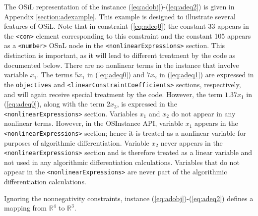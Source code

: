 \documentclass[11pt]{article}
\renewcommand{\_}{{\char"5F}}
\renewcommand{\{}{{\char"7B}}
\renewcommand{\}}{{\char"7D}}
\renewcommand{\^}{{\char"0D}}
\renewcommand{\'}{{\char"0D}}
\begin{document}
The OSiL representation of the instance  (\ref{eq:adobj})-(\ref{eq:adeq2}) is given in Appendix \ref{section:adexample}.  This example is designed to illustrate several features of OSiL. Note that in constraint  (\ref{eq:adeq0}) the constant 33 appears in the {\tt <con>} element corresponding to this constraint and the constant 105 appears as a {\tt <number>} OSnL node in the {\tt <nonlinearExpressions>} section.   This distinction is important, as it will lead to different treatment by the code as
documented below. There are no nonlinear terms in the instance that involve variable $x_{1}.$  The terms $5x_{1}$ in  (\ref{eq:adeq0}) and $7 x_{2}$ in (\ref{eq:adeq1}) are expressed in the {\tt objectives} and {\tt <linearConstraintCoefficients>}
sections, respectively, and will again receive special treatment by the code. However, the term $1.37x_1$ in (\ref{eq:adeq0}), 
along with the term $2x_3$, is expressed in the {\tt <nonlinearExpressions>} section.          Variables $x_{1}$ and $x_{2}$  do not appear in any nonlinear terms. However, in the OSInstance API, variable $x_{1}$  appears in the   {\tt <nonlinearExpressions>} section; hence it  is treated as a nonlinear variable for purposes of algorithmic differentiation. Variable $x_{2}$ never appears in the  {\tt <nonlinearExpressions>} section and is therefore treated as a linear variable and not used  in any algorithmic differentiation calculations. Variables that do not appear in the {\tt <nonlinearExpressions>} are never part of the algorithmic differentiation calculations. 

Ignoring the nonnegativity constraints, instance (\ref{eq:adobj})-(\ref{eq:adeq2})  defines a mapping  from $ \mathbb{R}^{4}$ to $ \mathbb{R}^{3}.$
\end{document}
